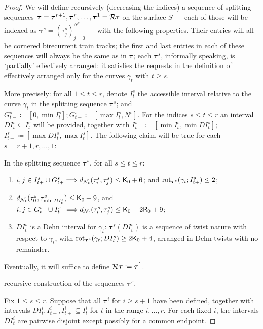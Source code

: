 \begin{proof}
We will define recursively (decreasing the indices) a sequence of splitting sequences $\bm\tau=\bm\tau^{r+1},\bm\tau^r,\ldots,\bm\tau^1={\mathcal R}\rm\tau$ on the surface $S$ --- each of those will be indexed as $\bm\tau^s=(\tau^s_j)_{j=0}^{N^s}$ --- with the following properties. Their entries will all be cornered birecurrent train tracks; the first and last entries in each of these sequences will always be the same as in $\bm\tau$; each $\bm\tau^s$, informally speaking, is `partially' effectively arranged: it satisfies the requests in the definition of effectively arranged only for the curves $\gamma_t$ with $t\geq s$.

More precisely: for all $1\leq t \leq r$, denote $I^s_t$ the accessible interval relative to the curve $\gamma_t$ in the splitting sequence $\bm\tau^s$; and $G_{t-}^s\coloneqq[0,\min I_t^s]; G_{t+}^s\coloneqq[\max I_t^s,N^s]$. For the indices $s\leq t\leq r$ an interval $DI^s_t\subseteq I^s_t$ will be provided, together with $I^s_{t-}\coloneqq[\min I^s_t,\min DI^s_t]$; $I^s_{t+}\coloneqq [\max DI^s_t,\max I^s_t]$. The following claim will be true for each $s=r+1,r,\ldots,1$:
\begin{claim}
In the splitting sequence $\bm\tau^s$, for all $s\leq t\leq r$:
\begin{enumerate}
\item $i,j\in I^s_{t+}\cup G^s_{t+}\Longrightarrow d_{{\mathcal N}_t}(\tau^s_i,\tau^s_j)\leq \mathsf{K}_0+6$; and $\mathrm{rot}_{\bm\tau^s}(\gamma_t;I^s_{t+})\leq 2$;
\item $d_{{\mathcal N}_t}(\tau^s_0,\tau^s_{\min DI^s_t})\leq \mathsf{K}_0+9$, and $i,j\in G^s_{t-}\cup I^s_{t-}\Longrightarrow d_{{\mathcal N}_t}(\tau^s_i,\tau^s_j)\leq \mathsf{K}_0+2\mathsf{R}_0+9$;
\item $DI^s_t$ is a Dehn interval for $\gamma_t$: $\bm\tau^s(DI^s_t)$ is a sequence of twist nature with respect to $\gamma_t$, with $\mathrm{rot}_{\bm\tau^s}(\gamma_t;DI^s_t)\geq 2\mathsf{K}_0+4$, arranged in Dehn twists with no remainder.
\end{enumerate}
\end{claim}
Eventually, it will suffice to define ${\mathcal R}\bm\tau\coloneqq \bm\tau^1$. 

 recursive construction of the sequences $\bm\tau^s$.

Fix $1\leq s\leq r$. Suppose that all $\bm\tau^i$ for $i\geq s+1$ have been defined, together with intervals $DI^i_t, I^i_{t-}, I^i_{t+}\subseteq I^i_t$ for $t$ in the range $i,\ldots,r$. For each fixed $i$, the intervals $DI^i_t$ are pairwise disjoint except possibly for a common endpoint.


\end{proof}
